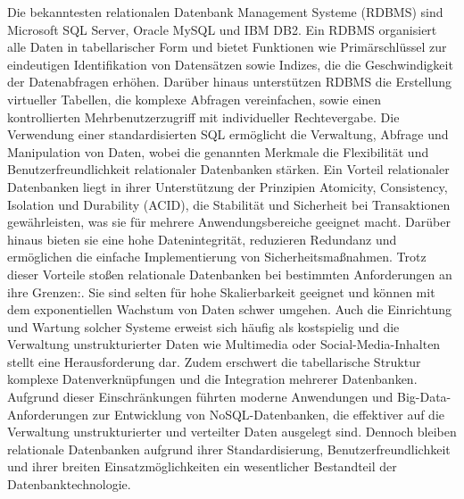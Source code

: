 \newpage \noindent
Die bekanntesten relationalen Datenbank Management Systeme (RDBMS) sind Microsoft SQL Server, Oracle MySQL und IBM DB2. Ein RDBMS organisiert alle Daten in tabellarischer Form und bietet Funktionen wie Primärschlüssel zur eindeutigen Identifikation von Datensätzen sowie Indizes, die die Geschwindigkeit der Datenabfragen erhöhen. Darüber hinaus unterstützen RDBMS die Erstellung virtueller Tabellen, die komplexe Abfragen vereinfachen, sowie einen kontrollierten Mehrbenutzerzugriff mit individueller Rechtevergabe. Die Verwendung einer standardisierten SQL ermöglicht die Verwaltung, Abfrage und Manipulation von Daten, wobei die genannten Merkmale die Flexibilität und Benutzerfreundlichkeit relationaler Datenbanken stärken. Ein Vorteil relationaler Datenbanken liegt in ihrer Unterstützung der Prinzipien Atomicity, Consistency, Isolation und Durability (ACID), die Stabilität und Sicherheit bei Transaktionen gewährleisten, was sie für mehrere Anwendungsbereiche geeignet macht. Darüber hinaus bieten sie eine hohe Datenintegrität, reduzieren Redundanz und ermöglichen die einfache Implementierung von Sicherheitsmaßnahmen. Trotz dieser Vorteile stoßen relationale Datenbanken bei bestimmten Anforderungen an ihre Grenzen:. Sie sind selten für hohe Skalierbarkeit geeignet und können mit dem exponentiellen Wachstum von Daten schwer umgehen. Auch die Einrichtung und Wartung solcher Systeme erweist sich häufig als kostspielig und die Verwaltung unstrukturierter Daten wie Multimedia oder Social-Media-Inhalten stellt eine Herausforderung dar. Zudem erschwert die tabellarische Struktur komplexe Datenverknüpfungen und die Integration mehrerer Datenbanken. Aufgrund dieser Einschränkungen führten moderne Anwendungen und Big-Data-Anforderungen zur Entwicklung von NoSQL-Datenbanken, die effektiver auf die Verwaltung unstrukturierter und verteilter Daten ausgelegt sind. Dennoch bleiben relationale Datenbanken aufgrund ihrer Standardisierung, Benutzerfreundlichkeit und ihrer breiten Einsatzmöglichkeiten ein wesentlicher Bestandteil der Datenbanktechnologie.  \citep{relationalDatabase}  \citep{9677042}
